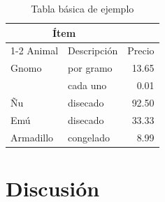 \documentclass[12pt]{article}
\begin{document}
\begin{table}[htbp]
  \caption{Tabla básica de ejemplo}
  \label{tab:BasicTable}
  \begin{tabular}{@{}llr@{}}
    \toprule
    \multicolumn{2}{c}{Ítem} \\ \cmidrule(r){1-2}
    Animal    & Descripción  & Precio \\ \midrule
    Gnomo     & por gramo    & 13.65  \\
              & cada uno     &  0.01  \\
    Ñu        & disecado     & 92.50  \\
    Emú       & disecado     & 33.33  \\
    Armadillo & congelado    &  8.99  \\ \bottomrule
  \end{tabular}
\end{table}

\section{Discusión}
\lipsum[17]

\newpage
\printbibliography[title={Referencias Bibliográficas}]
\end{document}
